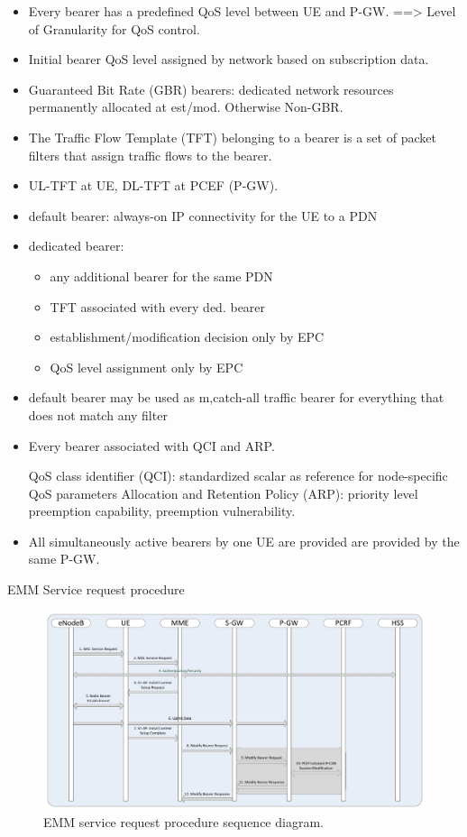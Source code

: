 \begin{itemize}
\item 	Every bearer has a predefined QoS level between UE and P-GW.
		==> Level of Granularity for QoS control.
\item	Initial bearer QoS level assigned by network based on subscription data.
\item	Guaranteed Bit Rate (GBR) bearers: dedicated network resources permanently allocated at est/mod. Otherwise Non-GBR.
\item	The Traffic Flow Template (TFT) belonging to a bearer is a set of packet filters that assign traffic flows to the bearer.
\item	UL-TFT at UE, DL-TFT at \gls{PCEF} (P-GW).
\item 	default bearer: always-on IP connectivity for the UE to a PDN
\item	dedicated bearer:   
			\begin{itemize}
				\item any additional bearer for the same PDN
				\item \gls{TFT} associated with every ded. bearer
				\item establishment/modification decision only by \gls{EPC}
				\item QoS level assignment only by \gls{EPC}
			\end{itemize}

\item	default bearer may be used as {m,c}atch-all traffic bearer for everything that does not match any filter
\item	Every bearer associated with QCI and ARP.

QoS class identifier (QCI): standardized scalar as reference for node-specific QoS parameters
Allocation and Retention Policy (ARP): priority level preemption capability, preemption vulnerability.

\item	All simultaneously active bearers by one UE are provided are provided by the same P-GW.
\end{itemize}

EMM Service request procedure

\begin{figure}[htb]
	\centering
	\includegraphics[width=1.2\textwidth]{images/UE-service-request.pdf}
	\caption{EMM service request procedure sequence diagram.}
	\label{c4:fig:3gpp-ueservicereq}
\end{figure}

